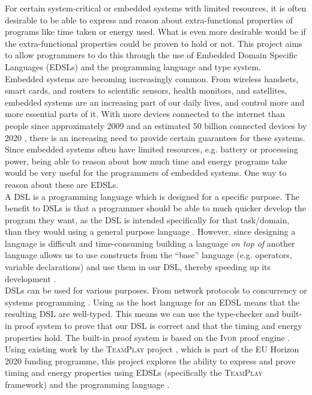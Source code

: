 For certain system-critical or embedded systems with limited resources, it is often desirable to be able to express and reason about extra-functional properties of programs like time taken or energy used. What is even more desirable would be if the extra-functional properties could be proven to hold or not. This project aims to allow programmers to do this through the use of Embedded Domain Specific Languages (EDSLs) and the \Idris programming language and type system.
\\

Embedded systems are becoming increasingly common. From wireless handsets, smart cards, and routers to scientific sensors, health monitors, and satellites, embedded systems are an increasing part of our daily lives, and control more and more essential parts of it. With more devices connected to the internet than people since approximately 2009 and an estimated 50 billion connected devices by 2020 \cite{cisco-whitepaper}, there is an increasing need to provide certain guarantees for these systems. Since embedded systems often have limited resources, e.g. battery or processing power, being able to reason about how much time and energy programs take would be very useful for the programmers of embedded systems. One way to reason about these are EDSLs.
\\

A DSL is a programming language which is designed for a specific purpose. The benefit to DSLs is that a programmer should be able to much quicker develop the program they want, as the DSL is intended specifically for that task/domain, than they would using a general purpose language \cite{685738}. However, since designing a language is difficult and time-consuming building a language \textit{on top of} another language allows us to use constructs from the ``base'' language (e.g. operators, variable declarations) and use them in our DSL, thereby speeding up its development \cite{hudak1996building}.
\\

DSLs can be used for various purposes. From network protocols \cite{5158855} to concurrency or systems programming \cite{brady2010correct,10.1007/978-3-642-27694-1_18}. Using \Idris as the host language for an EDSL means that the resulting DSL are well-typed. This means we can use the \Idris type-checker and built-in proof system to prove that our DSL is correct and that the timing and energy properties hold. The built-in proof system is based on the \textsc{Ivor} proof engine \cite{10.1007/978-3-540-74130-5_9,brady_2013}. Using existing work by the \textsc{TeamPlay} project \cite{teamplay:d1.1}, which is part of the EU Horizon 2020 funding programme, this project explores the ability to express and prove timing and energy properties using EDSLs (specifically the \textsc{TeamPlay} framework) and the \Idris programming language \cite{brady_2013}.
\\

